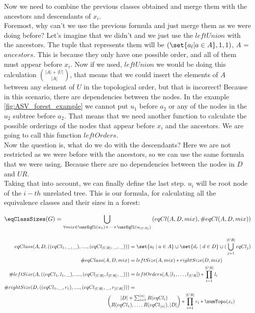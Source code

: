 Now we need to combine the previous classes obtained and merge them with the ancestors and descendants of $x_i$. \\

Foremost, why can't we use the previous formula and just merge them as we were doing before? Let's imagine that we didn't and we just use the $leftUnion$ with the ancestors. The tuple that represents them will be $(\set{ a_l | a \in A}, 1, 1)$, $A$ = $ancestors$. This is because they only have one possible order, and all of them must appear before $x_i$. Now if we used, $leftUnion$ we would be doing this calculation $\binom{|A| + |U|}{|A|}$, that means that we could insert the elements of $A$ between any element of $U$ in the topological order, but that is incorrect! Because in this scenario, there are dependencies between the nodes. In the example \ref{fig:ASV_forest_example} we cannot put $u_1$ before $a_2$ or any of the nodes in the $u_2$ subtree before $a_2$. That means that we need another function to calculate the possible orderings of the nodes that appear before $x_i$ and the ancestors. We are going to call this function $leftOrders$. \\
Now the question is, what do we do with the descendants? Here we are not restricted as we were before with the ancestors, so we can use the same formula that we were using. Because there are no dependencies between the nodes in $D$ and $UR$.\\
Taking that into account, we can finally define the last step. $u_i$ will be root node of the $i-th$ unrelated tree. This is our formula, for calculating all the equivalence classes and their sizes in a forest: 

\label{formula:equiv_classes_sizes}
\[
    \eqClassSizes(G) = 
    \bigcup_{\forall mix \in \unrEqCl(u_1) \times \dots \times \unrEqCl(u_{|UR|})} \left( eqCl(A,D, mix) , \#eqCl(A,D,mix) \right) 
\]


\begin{align*}
eqClass(A, D, ((eqCl_1, \_ , \_ ), ...., (eqCl_{|UR|}, \_ , \_))) &=  \set{a_l \mid a \in A} \cup \set{d_r \mid d \in D} \cup (\bigcup_{j=1}^{|UR|} eqCl_j) \\ 
\#eqClass(A, D, mix) &= leftSize(A,mix) * rightSize(D, mix)  \\ 
\#leftSize(A, ((eqCl_1, l_1, \_), ...., (eqCl_{|UR|}, l_{|UR|}, \_))) &= leftOrders(A, [ l_1, \dots, l_{|UR}]) * \prod_{i=1}^{|UR|} l_i  \\
\#rightSize(D, ((eqCl_1, \_, r_1), ...., (eqCl_{|UR|}, \_, r_{|UR|} ))) & = \\ & \hspace{-1.5cm} \binom{|D| + \sum_{i=1}^{|n|} R(eqCl_i)}{R(eqCl_1), \ldots, R(eqCl_{|n|}), |D|} * \prod_{i=1}^{|UR|} r_i * \numTopo(x_i)
\end{align*}

